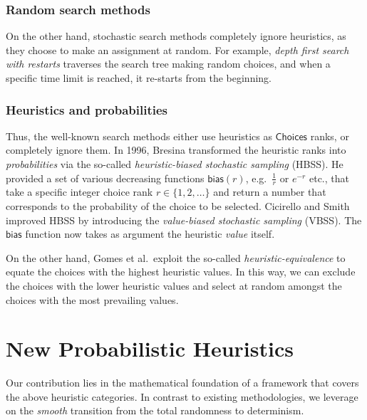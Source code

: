 \documentclass{ws-ijait}
\begin{document}
\subsubsection{Random search methods\label{random}}

On the other hand, stochastic search methods completely
ignore heuristics, as they choose to make an assignment at
random.\cite{Jafari2011} For example, \emph{depth first
search with restarts} traverses the search tree making
random choices, and when a specific time limit is reached,
it re-starts from the beginning.

\subsubsection{Heuristics and probabilities}

Thus, the well-known search methods either use heuristics as
$\mathsf{Choices}$ ranks, or completely ignore them. In
1996, Bresina transformed the heuristic ranks into
\emph{probabilities} via the so-called
\emph{heuristic-biased stochastic sampling}
(HBSS).\cite{Bresina1996} He provided a set of various
decreasing functions $\mathsf{bias}(r)$, e.g.\ $\frac{1}{r}$
or $e^{-r}$ etc., that take a specific integer choice rank
$r \in \{1, 2, \ldots\}$ and return a number that
corresponds to the probability of the choice to be selected.
Cicirello and Smith improved HBSS by introducing the
\emph{value-biased stochastic sampling} (VBSS). The
$\mathsf{bias}$ function now takes as argument the heuristic
\emph{value} itself.\cite{Cicirello2005}

On the other hand, Gomes et al.\ exploit the so-called
\emph{heuristic-equivalence} to equate the choices with the
highest heuristic values.\cite{Gomes2000} In this way, we
can exclude the choices with the lower heuristic values and
select at random amongst the choices with the most
prevailing values.


\section{New Probabilistic
         Heuristics\label{probabilistic-heuristics}}

Our contribution lies in the mathematical foundation of a
framework that covers the above heuristic categories. In
contrast to existing methodologies, we leverage on the
\emph{smooth} transition from the total randomness to
determinism.
\end{document}
